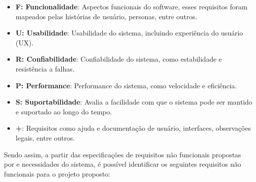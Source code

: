 \begin{itemize}

    \item \textbf{F: Funcionalidade}: Aspectos funcionais do software, esses requisitos foram mapeados pelas histórias de usuário, personas, entre outros. 

    \item \textbf{U: Usabilidade}: Usabilidade do sistema, incluindo experiência do usuário (UX).

    \item \textbf{R: Confiabilidade}: Confiabilidade do sistema, como estabilidade e resistência a falhas.

    \item \textbf{P: Performance}: Performance do sistema, como velocidade e eficiência.

    \item \textbf{S: Suportabilidade}: Avalia a facilidade com que o sistema pode ser mantido e suportado ao longo do tempo.

    \item \textbf{+}: Requisitos como ajuda e documentação de usuário, interfaces, observações legais, entre outros.

\end{itemize}

Sendo assim, a partir das especificações de requisitos não funcionais propostas por  e necessidades do sistema, é possível identificar os seguintes requisitos não funcionais para o projeto proposto:

